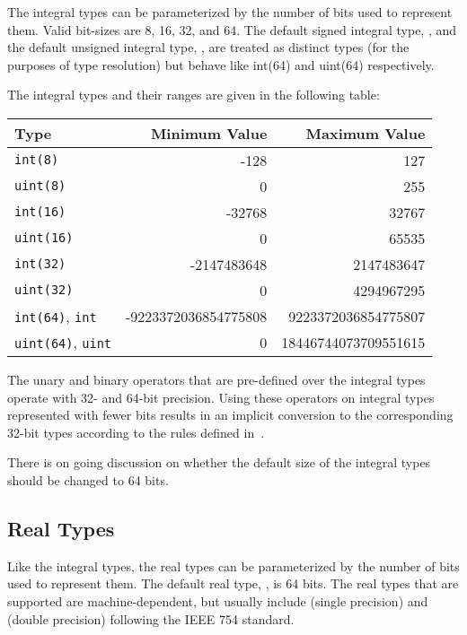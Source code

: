 The integral types can be parameterized by the number of bits used to
represent them.  Valid bit-sizes are 8, 16, 32, and 64.  
The default signed integral type, , and the
default unsigned integral type, , are treated as distinct types (for
the purposes of type resolution) but behave like int(64) and uint(64) respectively.

The integral types and their ranges are given in the following table:

\begin{center}
\begin{tabular}{|l|r|r|}
\hline
{\bf Type} & {\bf Minimum Value} & {\bf Maximum Value} \\
\hline
{\tt int(8)} & -128 & 127 \\
{\tt uint(8)} & 0 & 255 \\
{\tt int(16)} & -32768 & 32767 \\
{\tt uint(16)} & 0 & 65535 \\
{\tt int(32)} & -2147483648 & 2147483647 \\
{\tt uint(32)} & 0 & 4294967295 \\
{\tt int(64)}, {\tt int} & -9223372036854775808 & 9223372036854775807 \\
{\tt uint(64)}, {\tt uint} & 0 & 18446744073709551615 \\
\hline
\end{tabular}
\end{center}

The unary and binary operators that are pre-defined over the integral
types operate with 32- and 64-bit precision.  Using these operators on
integral types represented with fewer bits results in an implicit
conversion to the corresponding 32-bit types
according to the rules defined in~.

\begin{openissue}
There is on going discussion on whether the default size of the
integral types should be changed to 64 bits.
\end{openissue}


\subsection{Real Types}
\label{Real_Types}

Like the integral types, the real types can be parameterized by the
number of bits used to represent them.  The default real
type, , is 64 bits.  The real types that are supported are
machine-dependent, but usually include  (single
precision) and  (double precision) following the IEEE
754 standard.  

